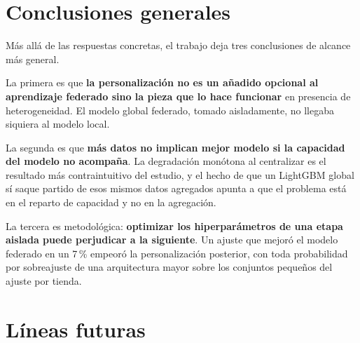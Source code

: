 \section{Conclusiones generales}

Más allá de las respuestas concretas, el trabajo deja tres conclusiones de alcance más general.

La primera es que \textbf{la personalización no es un añadido opcional al aprendizaje federado sino
la pieza que lo hace funcionar} en presencia de heterogeneidad. El modelo global federado, tomado
aisladamente, no llegaba siquiera al modelo local.

La segunda es que \textbf{más datos no implican mejor modelo si la capacidad del modelo no acompaña}.
La degradación monótona al centralizar es el resultado más contraintuitivo del estudio, y el hecho
de que un LightGBM global sí saque partido de esos mismos datos agregados apunta a que el problema
está en el reparto de capacidad y no en la agregación.

La tercera es metodológica: \textbf{optimizar los hiperparámetros de una etapa aislada puede
perjudicar a la siguiente}. Un ajuste que mejoró el modelo federado en un 7\,\% empeoró la
personalización posterior, con toda probabilidad por sobreajuste de una arquitectura mayor sobre los
conjuntos pequeños del ajuste por tienda.

\section{Líneas futuras}

